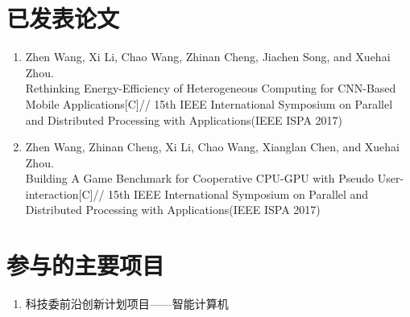 \begin{publications}

\section*{已发表论文}

\begin{enumerate}
\item Zhen Wang, Xi Li, Chao Wang, Zhinan Cheng, Jiachen Song, and Xuehai Zhou.\\
Rethinking Energy-Efficiency of Heterogeneous Computing for CNN-Based Mobile Applications[C]//
15th IEEE International Symposium on Parallel and Distributed Processing with Applications(IEEE ISPA 2017)
\item Zhen Wang, Zhinan Cheng, Xi Li, Chao Wang, Xianglan Chen, and Xuehai Zhou.\\
Building A Game Benchmark for Cooperative CPU-GPU with Pseudo User-\\interaction[C]//
15th IEEE International Symposium on Parallel and Distributed Processing with Applications(IEEE ISPA 2017)
\end{enumerate}


\section*{参与的主要项目}
\begin{enumerate}
\item 科技委前沿创新计划项目——智能计算机
\end{enumerate}

\end{publications}
